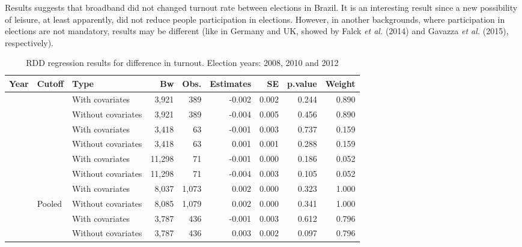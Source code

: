 \documentclass[
  12pt,
]{article}
\begin{document}
Results suggests that broadband did not changed turnout rate between
elections in Brazil. It is an interesting result since a new possibility
of leisure, at least apparently, did not reduce people participation in
elections. However, in another backgrounds, where participation in
elections are not mandatory, results may be different (like in Germany
and UK, showed by Falck \emph{et al.} (2014) and Gavazza \emph{et al.}
(2015), respectively).

\begin{table}[H]

\caption{\label{tab:reg.part.dif}RDD regression results for difference in turnout. Election years: 2008, 2010 and 2012}
\centering
\begin{tabular}[t]{lllrrrrrr}
\toprule
Year & Cutoff & Type & Bw & Obs. & Estimates & SE & p.value & Weight\\
\midrule
 &  & With covariates & 3,921 & 389 & -0.002 & 0.002 & 0.244 & 0.890\\


 & \multirow{-2}{*}{\raggedright\arraybackslash 20000} & Without covariates & 3,921 & 389 & -0.004 & 0.005 & 0.456 & 0.890\\


 &  & With covariates & 3,418 & 63 & -0.001 & 0.003 & 0.737 & 0.159\\


 & \multirow{-2}{*}{\raggedright\arraybackslash 40000} & Without covariates & 3,418 & 63 & 0.001 & 0.001 & 0.288 & 0.159\\


 &  & With covariates & 11,298 & 71 & -0.001 & 0.000 & 0.186 & 0.052\\


 & \multirow{-2}{*}{\raggedright\arraybackslash 60000} & Without covariates & 11,298 & 71 & -0.004 & 0.003 & 0.105 & 0.052\\


 &  & With covariates & 8,037 & 1,073 & 0.002 & 0.000 & 0.323 & 1.000\\


\multirow{-8}{*}{\raggedright\arraybackslash 2008} & \multirow{-2}{*}{\raggedright\arraybackslash Pooled} & Without covariates & 8,085 & 1,079 & 0.002 & 0.000 & 0.341 & 1.000\\

\cmidrule{1-9}
 &  & With covariates & 3,787 & 436 & -0.001 & 0.003 & 0.612 & 0.796\\


 & \multirow{-2}{*}{\raggedright\arraybackslash 20000} & Without covariates & 3,787 & 436 & 0.003 & 0.002 & 0.097 & 0.796\\



\end{tabular}
\end{table}
\end{document}
